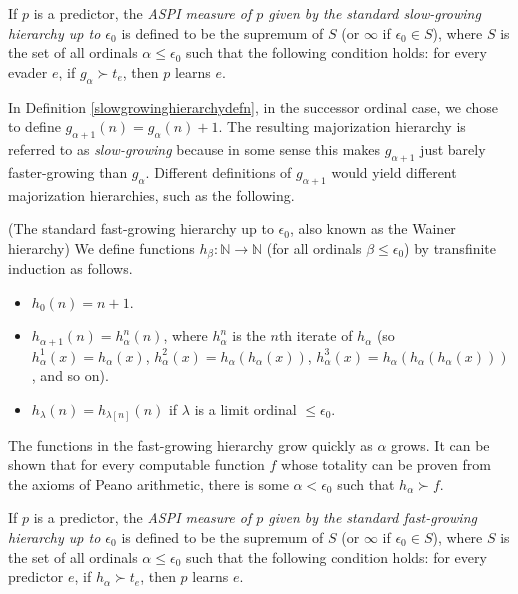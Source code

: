 \documentclass[twoside,11pt]{article}
\begin{document}
\begin{definition}
\label{tradmajorizationhierarchyhibbardmeasuredefn}
    If $p$ is a predictor, the \emph{ASPI measure of $p$ given by the
    standard slow-growing hierarchy up to $\epsilon_0$} is defined to be the
    supremum of $S$ (or $\infty$
    if $\epsilon_0\in S$), where $S$ is the set of all ordinals
    $\alpha\leq\epsilon_0$
    such that the following condition holds:
    for every evader $e$, if $g_\alpha\succ t_e$, then $p$ learns $e$.
\end{definition}

In Definition \ref{slowgrowinghierarchydefn}, in the successor ordinal case,
we chose to define $g_{\alpha+1}(n)=g_\alpha(n)+1$. The resulting majorization
hierarchy is referred to as \emph{slow-growing} because in some sense this
makes $g_{\alpha+1}$ just barely faster-growing than $g_\alpha$.
Different definitions of $g_{\alpha+1}$ would yield different majorization
hierarchies, such as the following.

\begin{definition}
\label{fastgrowinghierarchydefn}
    (The standard fast-growing hierarchy up to $\epsilon_0$, also known as
    the Wainer hierarchy)
    We define functions $h_\beta:\mathbb N\to\mathbb N$ (for all ordinals
    $\beta\leq \epsilon_0$) by transfinite induction as follows.
    \begin{itemize}
        \item
        $h_0(n)=n+1$.
        \item
        $h_{\alpha+1}(n) = h^n_\alpha(n)$, where $h^n_\alpha$ is the $n$th
        iterate of $h_\alpha$ (so $h^1_\alpha(x)=h_\alpha(x)$,
        $h^2_\alpha(x)=h_\alpha(h_\alpha(x))$,
        $h^3_\alpha(x)=h_\alpha(h_\alpha(h_\alpha(x)))$, and so on).
        \item
        $h_{\lambda}(n) = h_{\lambda[n]}(n)$ if $\lambda$ is a
        limit ordinal $\leq\epsilon_0$.
    \end{itemize}
\end{definition}

The functions in the fast-growing hierarchy grow quickly
as $\alpha$ grows. It can be shown \citep{wainer1987provably} that
for every computable function $f$ whose totality can be proven from the axioms of
Peano arithmetic, there is some $\alpha<\epsilon_0$ such that $h_\alpha\succ f$.

\begin{definition}
\label{fastmajorizationhierarchyhibbardmeasuredefn}
    If $p$ is a predictor, the \emph{ASPI measure of $p$ given by the
    standard fast-growing hierarchy up to $\epsilon_0$} is defined to be the
    supremum of $S$ (or $\infty$ if $\epsilon_0\in S$),
    where $S$ is the set of all ordinals $\alpha\leq\epsilon_0$ such that
    the following condition holds:
    for every predictor $e$, if $h_\alpha\succ t_e$, then $p$ learns $e$.
\end{definition}
\end{document}
